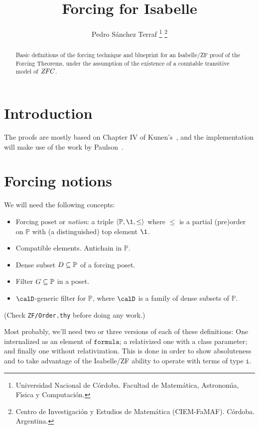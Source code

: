 \documentclass[11pt,english]{article}
\renewcommand{\PP}{\mathbb{P}}
\newcommand{\formula}{\ensuremath{\mathtt{formula}}}
\newcommand{\tyi}{\mathtt{i}}
\begin{document}
\title{Forcing for Isabelle}
\author{%
  Pedro Sánchez Terraf%
  \thanks{
    Universidad Nacional de C\'ordoba. 
    Facultad de Matem\'atica, Astronom\'{\i}a,  F\'{\i}sica y
    Computaci\'on.}
  \thanks{
    Centro de Investigaci\'on y Estudios de Matem\'atica (CIEM-FaMAF).
    C\'ordoba. Argentina.}
}
%
\maketitle
%
\begin{abstract}
  Basic definitions of the forcing technique and blueprint for an
  Isabelle/ZF proof of the Forcing Theorems, under the assumption of
  the existence of a countable transitive model of $\mathit{ZFC}$.   
\end{abstract}


%
\section{Introduction}
The proofs are mostly based on Chapter IV of
Kunen's~\cite{kunen2011set}, and the implementation will make use of
the work by Paulson~\cite{paulson_2003}. 

\section{Forcing notions}
We will need the following concepts:
\begin{itemize}
\item Forcing poset or \emph{notion}: a triple $\lb \PP, \1, \leq\rb$ where $\leq$ is a
  partial (pre)order on $\PP$ with (a distinguished) top element $\1$.
\item Compatible elements. Antichain in $\PP$. 
\item Dense subset $D\sbq\PP$ of a forcing poset.
\item Filter $G\sbq\PP$ in a poset.
\item $\calD$-generic filter for $\PP$, where $\calD$ is a family of
  dense subsets of $\PP$.
\end{itemize}
(Check \verb|ZF/Order.thy| before doing any work.)

Most probably, we'll need two or three versions of each of these
definitions: One internalized as an element of \formula;  a relativized
one with a class parameter; and finally one without
relativization. This is done in order to show absoluteness and to take
advantage of the Isabelle/ZF ability to operate with terms of type
$\tyi$.
\end{document}

